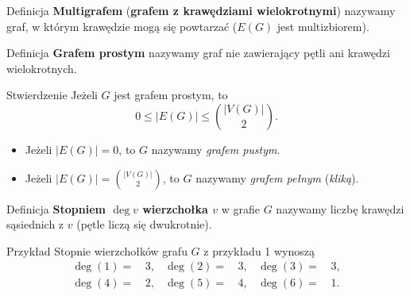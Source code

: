 \documentclass[a4paper,10pt]{beamer}
\begin{document}
	
		
\begin{frame}
			
	\begin{block}{Definicja}
		{\bf Multigrafem} ({\bf grafem z krawędziami wielokrotnymi}) nazywamy graf, w którym krawędzie mogą się powtarzać ($E(G)$ jest multizbiorem).
	\end{block}
	

			
\end{frame}





\begin{frame}
	
	\begin{block}{Definicja}
	{\bf Grafem prostym} nazywamy graf nie zawierający pętli ani krawędzi wielokrotnych. 
	\end{block}

	\medskip

	\begin{block}{Stwierdzenie}
		Jeżeli $G$ jest grafem prostym, to
	$$0\leqslant|E(G)|\leqslant{|V(G)|\choose2}.$$
	\end{block}

	\medskip

	\begin{itemize}
\item Jeżeli $|E(G)|=0$, to $G$ nazywamy {\it grafem pustym}.
\item Jeżeli $\displaystyle |E(G)|={|V(G)|\choose2}$, to $G$ nazywamy {\it grafem pełnym} ({\it kliką}).
	\end{itemize}

\end{frame}




\begin{frame}
	
	\begin{block}{Definicja}
		{\bf Stopniem $\deg v$ wierzchołka $v$} w grafie $G$ nazywamy liczbę krawędzi sąsiednich z $v$ (pętle liczą się dwukrotnie).
	\end{block}

\medskip

	\begin{exampleblock}{Przykład}
	Stopnie wierzchołków grafu $G$ z przykładu 1 wynoszą
	\begin{align*}
	\deg(1)=&\,3,&\deg(2)=&\,3,&\deg(3)=&\,3,\\
	\deg(4)=&\,2,&\deg(5)=&\,4,&\deg(6)=&\,1.\\
	\end{align*}
	\end {exampleblock}

\end{frame}
\end{document}
